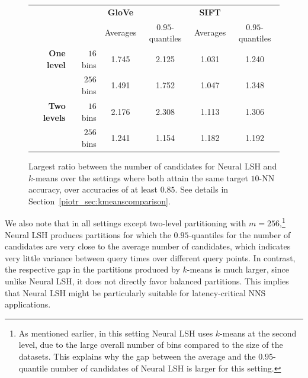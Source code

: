 \documentclass[11pt]{article}
\begin{document}
\begin{figure}
\centering
\begin{tabular}{|r|r|cc|cc|}
\hline
 && \textbf{GloVe} &  & \textbf{SIFT} & \\
 && Averages & $0.95$-quantiles  & Averages & $0.95$-quantiles \\
 \hline
\textbf{One level} & $16$ bins & 1.745 & 2.125 & 1.031 & 1.240 \\
& $256$ bins & 1.491 & 1.752 & 1.047 & 1.348 \\
\hline
\textbf{Two levels} & $16$ bins & 2.176 & 2.308 & 1.113 & 1.306 \\
& $256$ bins & 1.241 & 1.154 & 1.182 & 1.192 \\
\hline
\end{tabular}
\caption{Largest ratio between the number of candidates for Neural LSH and $k$-means over the settings where both attain the same target $10$-NN accuracy, over accuracies of at least $0.85$.
See details in Section~\ref{piotr_sec:kmeanscomparison}.}
\label{piotr_table_kmeans}
\end{figure}

We also note that in all settings except two-level partitioning with $m=256$,\footnote{As mentioned earlier, in this setting Neural LSH uses $k$-means at the second level, due to the large overall number of bins compared to the size of the datasets. This explains why the gap between the average and the $0.95$-quantile number of candidates of Neural LSH is larger for this setting.}
Neural LSH produces partitions for which the 
$0.95$-quantiles for the number of candidates are very close to the average number of candidates, which indicates very little variance between query times over different query points.
In contrast, the respective gap in the partitions produced by $k$-means is much larger, since unlike Neural LSH, it does not directly favor balanced partitions.
This implies that Neural LSH might be particularly suitable for latency-critical
NNS applications.

\end{document}
